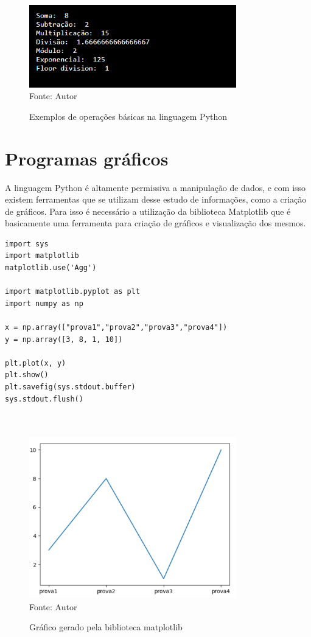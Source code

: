 \begin{figure}[H]
	\begin{center}
		\caption{Exemplos de operações básicas na linguagem Python} \label{ling1}
		\includegraphics[width=9cm]{operacoesBasicas1} \\
		{\tiny \sf Fonte:{ Autor}}
	\end{center}
\end{figure}

    \section{Programas gr\'{a}ficos}
A linguagem Python é altamente permissiva a manipulação de dados, e com isso existem ferramentas que se utilizam desse estudo de informações, como a criação de gráficos. Para isso é necessário a utilização da biblioteca Matplotlib que é basicamente uma ferramenta para criação de gráficos e visualização dos mesmos.

\begin{lstlisting}
import sys
import matplotlib
matplotlib.use('Agg')

import matplotlib.pyplot as plt
import numpy as np

x = np.array(["prova1","prova2","prova3","prova4"])
y = np.array([3, 8, 1, 10])

plt.plot(x, y)
plt.show()
plt.savefig(sys.stdout.buffer)
sys.stdout.flush()

	
\end{lstlisting}
  
  \begin{figure}[H]
  	\begin{center}
  		\caption{Gráfico gerado pela biblioteca matplotlib} \label{ling1}
  		\includegraphics[width=9cm]{grafico py.PNG} \\
  		{\tiny \sf Fonte:{ Autor}}
  	\end{center}
  \end{figure}
  
